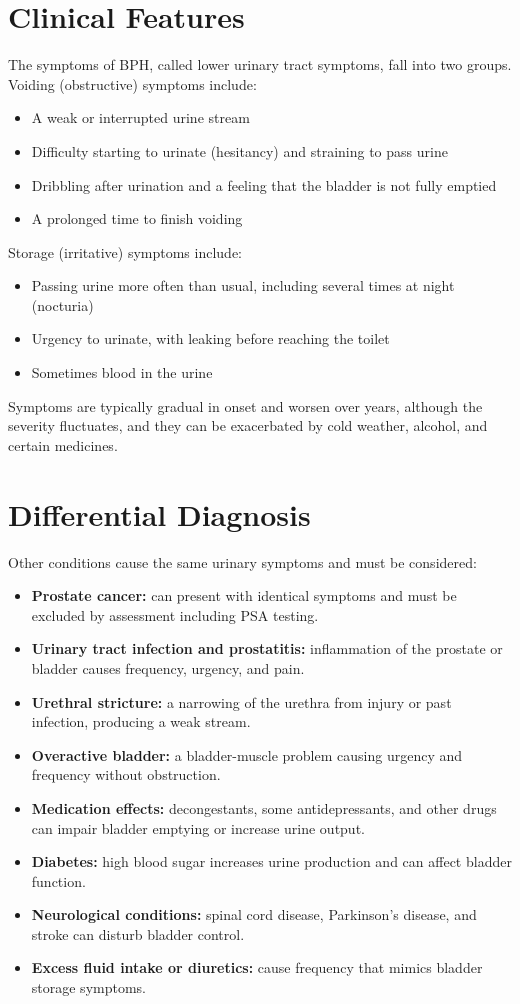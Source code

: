 \section*{Clinical Features}
The symptoms of BPH, called lower urinary tract symptoms, fall into two groups. Voiding (obstructive) symptoms include:
\begin{itemize}
    \item A weak or interrupted urine stream
    \item Difficulty starting to urinate (hesitancy) and straining to pass urine
    \item Dribbling after urination and a feeling that the bladder is not fully emptied
    \item A prolonged time to finish voiding
\end{itemize}
Storage (irritative) symptoms include:
\begin{itemize}
    \item Passing urine more often than usual, including several times at night (nocturia)
    \item Urgency to urinate, with leaking before reaching the toilet
    \item Sometimes blood in the urine
\end{itemize}
Symptoms are typically gradual in onset and worsen over years, although the severity fluctuates, and they can be exacerbated by cold weather, alcohol, and certain medicines.

\section*{Differential Diagnosis}
Other conditions cause the same urinary symptoms and must be considered:
\begin{itemize}
    \item \textbf{Prostate cancer:} can present with identical symptoms and must be excluded by assessment including PSA testing.
    \item \textbf{Urinary tract infection and prostatitis:} inflammation of the prostate or bladder causes frequency, urgency, and pain.
    \item \textbf{Urethral stricture:} a narrowing of the urethra from injury or past infection, producing a weak stream.
    \item \textbf{Overactive bladder:} a bladder-muscle problem causing urgency and frequency without obstruction.
    \item \textbf{Medication effects:} decongestants, some antidepressants, and other drugs can impair bladder emptying or increase urine output.
    \item \textbf{Diabetes:} high blood sugar increases urine production and can affect bladder function.
    \item \textbf{Neurological conditions:} spinal cord disease, Parkinson's disease, and stroke can disturb bladder control.
    \item \textbf{Excess fluid intake or diuretics:} cause frequency that mimics bladder storage symptoms.
\end{itemize}

